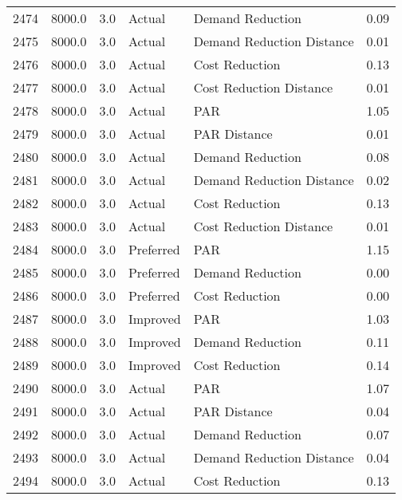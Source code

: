 \begin{longtable}{lrrllr}
2474 &       8000.0 &     3.0 &         Actual &           Demand Reduction &   0.09 \\
2475 &       8000.0 &     3.0 &         Actual &  Demand Reduction Distance &   0.01 \\
2476 &       8000.0 &     3.0 &         Actual &             Cost Reduction &   0.13 \\
2477 &       8000.0 &     3.0 &         Actual &    Cost Reduction Distance &   0.01 \\
2478 &       8000.0 &     3.0 &         Actual &                        PAR &   1.05 \\
2479 &       8000.0 &     3.0 &         Actual &               PAR Distance &   0.01 \\
2480 &       8000.0 &     3.0 &         Actual &           Demand Reduction &   0.08 \\
2481 &       8000.0 &     3.0 &         Actual &  Demand Reduction Distance &   0.02 \\
2482 &       8000.0 &     3.0 &         Actual &             Cost Reduction &   0.13 \\
2483 &       8000.0 &     3.0 &         Actual &    Cost Reduction Distance &   0.01 \\
2484 &       8000.0 &     3.0 &      Preferred &                        PAR &   1.15 \\
2485 &       8000.0 &     3.0 &      Preferred &           Demand Reduction &   0.00 \\
2486 &       8000.0 &     3.0 &      Preferred &             Cost Reduction &   0.00 \\
2487 &       8000.0 &     3.0 &       Improved &                        PAR &   1.03 \\
2488 &       8000.0 &     3.0 &       Improved &           Demand Reduction &   0.11 \\
2489 &       8000.0 &     3.0 &       Improved &             Cost Reduction &   0.14 \\
2490 &       8000.0 &     3.0 &         Actual &                        PAR &   1.07 \\
2491 &       8000.0 &     3.0 &         Actual &               PAR Distance &   0.04 \\
2492 &       8000.0 &     3.0 &         Actual &           Demand Reduction &   0.07 \\
2493 &       8000.0 &     3.0 &         Actual &  Demand Reduction Distance &   0.04 \\
2494 &       8000.0 &     3.0 &         Actual &             Cost Reduction &   0.13 \\

\end{longtable}
